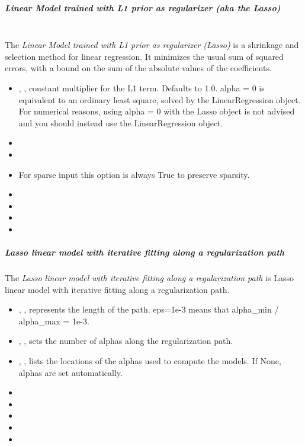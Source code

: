 \subparagraph{Linear Model trained with L1 prior as regularizer (aka the Lasso)}
\mbox{}
\\The \textit{Linear Model trained with L1 prior as regularizer (Lasso)} is a
shrinkage and selection method for linear regression.
%
It minimizes the usual sum of squared errors, with a bound on the sum of the
absolute values of the coefficients.
%
\begin{itemize}
  \item {}, , constant multiplier
  for the L1 term.
  Defaults to 1.0.
  alpha = 0 is equivalent to an ordinary least square, solved by the
  LinearRegression object.
  For numerical reasons, using alpha = 0 with the Lasso object is not advised
  and you should instead use the LinearRegression object.
  \item {}
  \item {}
  \item \precomputeDescription{}
  \nb For sparse input this option is always True to preserve sparsity.
  \item \maxIterDescription{}
  \item {}
  \item \warmStartDescription{}
  \item \positiveDescription{}
\end{itemize}

\subparagraph{Lasso linear model with iterative fitting along a regularization
  path}
\mbox{}

The \textit{Lasso linear model with iterative fitting along a regularization
path} is Lasso linear model with iterative fitting along a regularization 
path. 
\begin{itemize}
  \item {}, , represents the length of
  the path.
  eps=1e-3 means that alpha\_min / alpha\_max = 1e-3.
  \item {} , , sets the number of
  alphas along the regularization path.
  \item {}, , lists the
  locations of the alphas used to compute the models.
  If None, alphas are set automatically.
  \item \precomputeDescription{}
  \item \maxIterDescription{}
  \item {}
  \item \verDescriptionB
  \item \positiveDescription{}
\end{itemize}

